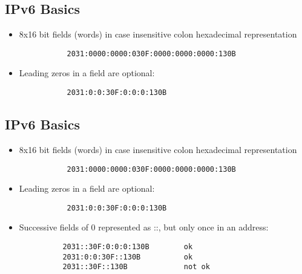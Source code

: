 \documentclass[xga]{xdvislides}
\begin{document}
\subsection{IPv6 Basics}
\begin{itemize}
	\item 8x16 bit fields (words) in case insensitive colon hexadecimal
		representation
\begin{verbatim}
           2031:0000:0000:030F:0000:0000:0000:130B
\end{verbatim}
	\item Leading zeros in a field are optional:
\begin{verbatim}
           2031:0:0:30F:0:0:0:130B
\end{verbatim}
\end{itemize}

\subsection{IPv6 Basics}
\begin{itemize}
	\item 8x16 bit fields (words) in case insensitive colon hexadecimal
		representation
\begin{verbatim}
           2031:0000:0000:030F:0000:0000:0000:130B
\end{verbatim}
	\item Leading zeros in a field are optional:
\begin{verbatim}
           2031:0:0:30F:0:0:0:130B
\end{verbatim}
	\item Successive fields of 0 represented as ::, but only once in
			an address:
\begin{verbatim}
          2031::30F:0:0:0:130B        ok
          2031:0:0:30F::130B          ok
          2031::30F::130B             not ok
\end{verbatim}
\end{itemize}
\end{document}
